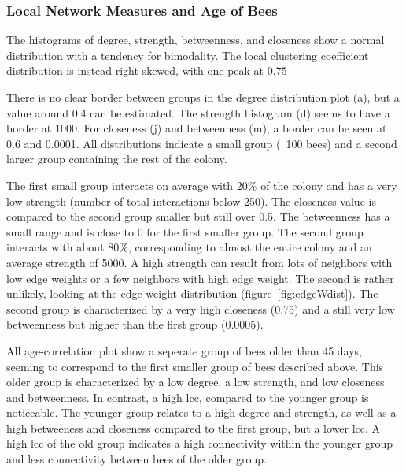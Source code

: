 \subsubsection{Local Network Measures and Age of Bees}
The histograms of degree, strength, betweenness, and closeness show a normal distribution with a tendency for bimodality. The local clustering coefficient distribution is instead right skewed, with one peak at $0.75$

There is no clear border between groups in the degree distribution plot (a), but a value around 0.4 can be estimated.
The strength histogram (d) seems to have a border at 1000.
For closeness (j) and betweenness (m), a border can be seen at 0.6 and 0.0001.
All distributions indicate a small group (~100 bees) and a second larger group containing the rest of the colony.

The first small group interacts on average with 20\% of the colony and has a very low strength (number of total interactions below 250). The closeness value is compared to the second group smaller but still over 0.5. The betweenness has a small range and is close to 0 for the first smaller group.
The second group interacts with about 80\%, corresponding to almost the entire colony and an average strength of 5000. A high strength can result from lots of neighbors with low edge weights or a few neighbors with high edge weight. The second is rather unlikely, looking at the edge weight distribution (figure~\ref{fig:edgeWdist}). The second group is characterized by a very high closeness (0.75) and a still very low betweenness but higher than the first group (0.0005).

All age-correlation plot show a seperate group of bees older than 45 days, seeming to correspond to the first smaller group of bees described above.
This older group is characterized by a low degree, a low strength, and low closeness and betweenness. In contrast, a high lcc, compared to the younger group is noticeable.
The younger group relates to a high degree and strength, as well as a high betweeness and closeness compared to the first group, but a lower lcc.
A high lcc of the old group indicates a high connectivity within the younger group and less connectivity between bees of the older group.

